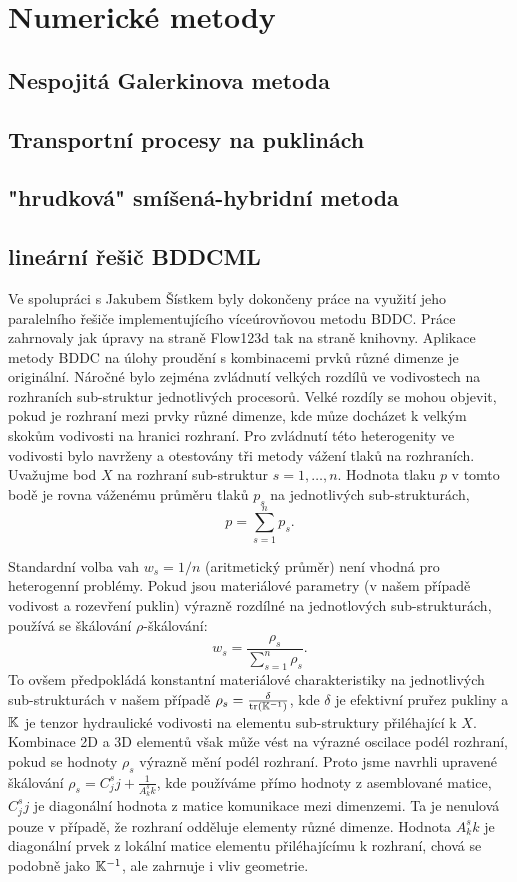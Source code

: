 \documentclass[11pt]{report}
\begin{document}
\section{Numerické metody}
\subsection{Nespojitá Galerkinova metoda}


\subsection{Transportní procesy na puklinách}
\label{sc:ad_on_fractures}


\subsection{"hrudková" smíšená-hybridní metoda}
\subsection{lineární řešič BDDCML}
Ve spolupráci s Jakubem Šístkem byly dokončeny práce na využití jeho 
paralelního řešiče implementujícího víceúrovňovou metodu BDDC. Práce zahrnovaly 
jak úpravy na straně Flow123d tak na straně knihovny. Aplikace metody BDDC na 
úlohy proudění s kombinacemi prvků různé dimenze je originální. Náročné bylo 
zejména zvládnutí velkých rozdílů ve vodivostech na rozhraních sub-struktur 
jednotlivých procesorů. Velké rozdíly se mohou objevit, pokud je rozhraní mezi 
prvky různé dimenze, kde můze docházet k velkým skokům vodivosti na hranici 
rozhraní. Pro zvládnutí této heterogenity ve vodivosti bylo navrženy a 
otestovány tři metody vážení tlaků na rozhraních. Uvažujme bod $X$ na rozhraní 
sub-struktur $s=1,\dots,n$. Hodnota tlaku $p$ v tomto bodě je rovna váženému 
průměru tlaků $p_s$ na jednotlivých sub-strukturách, 
\[
    p = \sum_{s=1}^n p_s. 
\]

Standardní volba vah $w_s=1/n$ (aritmetický průměr) není vhodná pro heterogenní 
problémy. Pokud jsou materiálové parametry (v našem případě vodivost a 
rozevření puklin) výrazně rozdílné na jednotlových sub-strukturách, používá se 
škálování $\rho$-škálování:
\[
    w_s=\frac{\rho_s}{\sum_{s=1}^n \rho_s}.
\]
To ovšem předpokládá konstantní materiálové charakteristiky na jednotlivých 
sub-strukturách v našem případě $\rho_s=\frac{\delta}{\text{tr}({\mathbb{K}}^{-1})}$, 
kde $\delta$ je efektivní pruřez pukliny a ${\mathbb{K}}$ je tenzor 
hydraulické vodivosti na elementu sub-struktury přiléhající k $X$. Kombinace 2D 
a 3D elementů však může vést na výrazné oscilace podél rozhraní, pokud se 
hodnoty $\rho_s$ výrazně mění podél rozhraní. Proto jsme navrhli upravené 
škálování $\rho_s=C^s_jj + \frac{1}{A^s_kk}$, kde používáme přímo hodnoty z 
asemblované matice, $C^s_jj$ je diagonální hodnota z matice komunikace mezi 
dimenzemi. Ta je nenulová pouze v případě, že rozhraní odděluje elementy různé 
dimenze. Hodnota $A^s_kk$ je diagonální prvek z lokální matice elementu 
přiléhajícímu k rozhraní, chová se podobně jako ${\mathbb{K}}^{-1}$, ale zahrnuje i 
vliv geometrie. 
\end{document}
